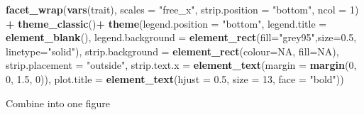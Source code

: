 \documentclass[
]{article}
\newenvironment{Shaded}{\begin{snugshade}}{\end{snugshade}}
\newcommand{\DataTypeTok}[1]{\textcolor[rgb]{0.13,0.29,0.53}{#1}}
\newcommand{\DecValTok}[1]{\textcolor[rgb]{0.00,0.00,0.81}{#1}}
\newcommand{\FloatTok}[1]{\textcolor[rgb]{0.00,0.00,0.81}{#1}}
\newcommand{\KeywordTok}[1]{\textcolor[rgb]{0.13,0.29,0.53}{\textbf{#1}}}
\newcommand{\NormalTok}[1]{#1}
\newcommand{\OperatorTok}[1]{\textcolor[rgb]{0.81,0.36,0.00}{\textbf{#1}}}
\newcommand{\OtherTok}[1]{\textcolor[rgb]{0.56,0.35,0.01}{#1}}
\newcommand{\StringTok}[1]{\textcolor[rgb]{0.31,0.60,0.02}{#1}}
\begin{document}
\begin{Shaded}
\begin{Highlighting}[]
\StringTok{  }\KeywordTok{facet\_wrap}\NormalTok{(}\KeywordTok{vars}\NormalTok{(trait), }\DataTypeTok{scales =} \StringTok{"free\_x"}\NormalTok{, }\DataTypeTok{strip.position =}  \StringTok{"bottom"}\NormalTok{, }\DataTypeTok{ncol =} \DecValTok{1}\NormalTok{) }\OperatorTok{+}
\StringTok{  }\KeywordTok{theme\_classic}\NormalTok{()}\OperatorTok{+}
\StringTok{  }\KeywordTok{theme}\NormalTok{(}\DataTypeTok{legend.position =} \StringTok{"bottom"}\NormalTok{, }\DataTypeTok{legend.title =} \KeywordTok{element\_blank}\NormalTok{(), }\DataTypeTok{legend.background =} \KeywordTok{element\_rect}\NormalTok{(}\DataTypeTok{fill=}\StringTok{"grey95"}\NormalTok{,}\DataTypeTok{size=}\FloatTok{0.5}\NormalTok{, }\DataTypeTok{linetype=}\StringTok{"solid"}\NormalTok{), }\DataTypeTok{strip.background =} \KeywordTok{element\_rect}\NormalTok{(}\DataTypeTok{colour=}\OtherTok{NA}\NormalTok{, }\DataTypeTok{fill=}\OtherTok{NA}\NormalTok{), }\DataTypeTok{strip.placement =} \StringTok{"outside"}\NormalTok{, }\DataTypeTok{strip.text.x =} \KeywordTok{element\_text}\NormalTok{(}\DataTypeTok{margin =} \KeywordTok{margin}\NormalTok{(}\DecValTok{0}\NormalTok{, }\DecValTok{0}\NormalTok{, }\FloatTok{1.5}\NormalTok{, }\DecValTok{0}\NormalTok{)), }\DataTypeTok{plot.title =} \KeywordTok{element\_text}\NormalTok{(}\DataTypeTok{hjust =} \FloatTok{0.5}\NormalTok{, }\DataTypeTok{size =} \DecValTok{13}\NormalTok{, }\DataTypeTok{face =} \StringTok{"bold"}\NormalTok{))}
\end{Highlighting}
\end{Shaded}

Combine into one figure
\end{document}
